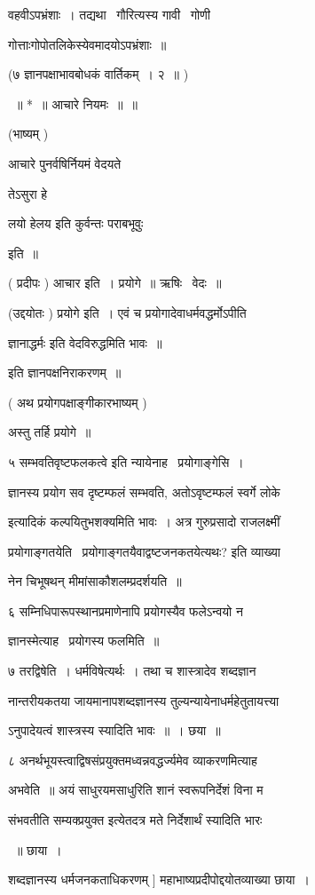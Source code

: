 \documentclass[11pt, openany]{book}
\begin{document}
वहवीऽपभ्रंशाः~। तद्यथा \textendash\ गौरित्यस्य गावी \textendash\ गोणी \textendash\ 

गोत्ताःगोपोतलिकेस्येवमादयोऽपभ्रंशाः~॥ 

(७ ज्ञानपक्षाभावबोधकं वार्तिकम्~। २~॥ ) 

~॥ *~॥ आचारे नियमः~॥~॥ 

(भाष्यम् ) 

आचारे पुनर्वषिर्नियमं वेदयते \textendash\ {\qt तेऽसुरा हे \textendash\ 

लयो हेलय इति कुर्वन्तः पराबभूवुः} इति~॥ 

( प्रदीपः ) आचार इति~। प्रयोगे~॥ ऋषिः \textendash\ वेदः~॥ 

(उद्दयोतः ) प्रयोगे इति~। एवं च प्रयोगादेवाधर्मवद्धर्मोऽपीति 

ज्ञानाद्धर्मः इति वेदविरुद्धमिति भावः~॥ 

इति ज्ञानपक्षनिराकरणम्~॥ 

( अथ प्रयोगपक्षाङ्गीकारभाष्यम् ) 

अस्तु तर्हि प्रयोगे~॥ 

५ {\qt सम्भवतिवृष्टफलकत्वे} इति न्यायेनाह \textendash\ प्रयोगाङ्गेसि~। 

ज्ञानस्य प्रयोग सव दृष्टम्फलं सम्भवति, अतोऽवृष्टम्फलं {\qt स्वर्गे लोके} 

इत्यादिकं कल्पयितुभशक्यमिति भावः~। अत्र गुरुप्रसादो राजलक्ष्मीं 

प्रयोगाङ्गतयेति \textendash\ प्रयोगाङ्गतयैवाद्वष्टजनकतयेत्यथः? इति व्याख्या \textendash\ 

नेन चिभूषथन् मीमांसाकौशलम्प्रदर्शयति~॥ 

६ सम्निधिपारूपस्थानप्रमाणेनापि प्रयोगस्यैव फलेऽन्वयो न 

ज्ञानस्मेत्याह \textendash\ प्रयोगस्य फलमिति~॥ 

७ तरद्विषेति~। धर्मविषेत्यर्थः~। तथा च शास्त्रादेव शब्दज्ञान \textendash\ 

नान्तरीयकतया जायमानापशब्दज्ञानस्य तुल्यन्यायेनाधर्महेतुतायत्त्या \textendash\ 

ऽनुपादेयत्वं शास्त्रस्य स्यादिति भावः~॥~। छया~॥ 

८ अनर्थभूयस्त्वाद्विषसंप्रयुक्तमध्वन्नवद्धर्ज्यमेव व्याकरणमित्याह \textendash\ 

अभवेति~॥ अयं साधुरयमसाधुरिति शानं स्वरूपनिर्देशं विना म 

संभवतीति सम्यक्प्रयुक्त इत्येतदत्र मते निर्देशार्थं स्यादिति भारः 

~॥ छाया~। 

शब्दज्ञानस्य धर्मजनकताधिकरणम् ] महाभाष्यप्रदीपोद्दयोतव्याख्या छाया~। 
\end{document}
